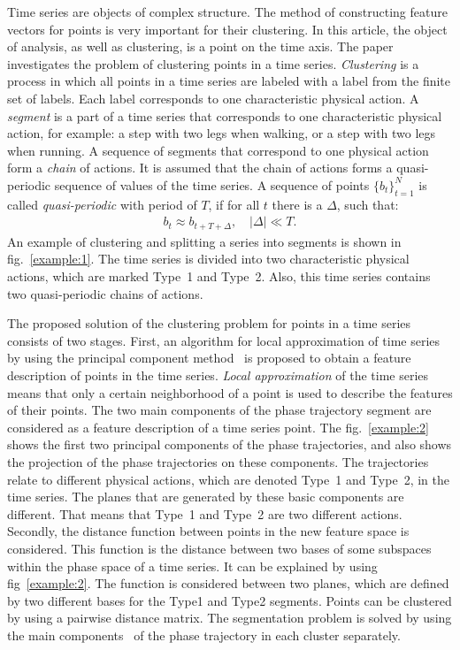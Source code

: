 \documentclass[12pt, twoside]{article}
\numberwithin{equation}{section}
\begin{document}
Time series are objects of complex structure. 
The method of constructing feature vectors for points is very important for their clustering.
In this article, the object of analysis, as well as clustering, is a point on the time axis.
The paper investigates the problem of clustering points in a time series.
\textit{Clustering} is a process in which all points in a time series are labeled with a label from the finite set of labels.
Each label corresponds to one characteristic physical action.
A \textit{segment} is a part of a time series that corresponds to one characteristic physical action, for example: a step with two legs when walking, or a step with two legs when running.
A sequence of segments that correspond to one physical action form a \textit{chain} of actions.
It is assumed that the chain of actions forms a quasi-periodic sequence of values of the time series.
A sequence of points $\{b_t\}_{t=1}^{N}$ is called \textit{quasi-periodic} with period of $T$, if for all $t$ there is a $\Delta$, such that:
\begin{equation}
\label{eq:int:1}
\begin{aligned}
b_t \approx b_{t+T+\Delta}, \quad \left|\Delta\right| \ll T.
\end{aligned}
\end{equation}
An example of clustering and splitting a series into segments is shown in fig.~\ref{example:1}. 
The time series is divided into two characteristic physical actions, which are marked Type~1 and Type~2. 
Also, this time series contains two quasi-periodic chains of actions.

The proposed solution of the clustering problem for points in a time series consists of two stages.
First, an algorithm for local approximation of time series by using the principal component method~\cite{Shiglavsi1997} is proposed to obtain a feature description of points in the time series.
\textit{Local approximation} of the time series means that only a certain neighborhood of a point is used to describe the features of their points.
The two main components of the phase trajectory segment are considered as a feature description of a time series point.
The fig.~\ref{example:2} shows the first two principal components of the phase trajectories, and also shows the projection of the phase trajectories on these components.
The trajectories relate to different physical actions, which are denoted Type~1 and Type~2, in the time series.
The planes that are generated by these basic components are different.
That means that Type~1 and Type~2 are two different actions.
Secondly, the distance function between points in the new feature space is considered.
This function is the distance between two bases of some subspaces within the phase space of a time series.
It can be explained by using fig~\ref{example:2}. The function is considered between two planes, which are defined by two different bases for the Type1 and Type2 segments.
Points can be clustered by using a pairwise distance matrix. 
The segmentation problem is solved by using the main components~\cite{motrenko2015} of the phase trajectory in each cluster separately.
\end{document}
